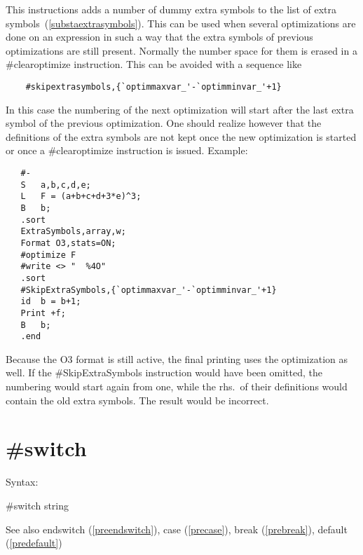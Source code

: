 \noindent This instructions adds a number of dummy extra 
symbols to the list of extra 
symbols~(\ref{substaextrasymbols}). This can be used when several 
optimizations are done on an expression in such a way that the extra 
symbols of previous optimizations are still present. Normally the number 
space for them is erased in a \#clearoptimize instruction. This can be 
avoided with a sequence like
\begin{verbatim}
	#skipextrasymbols,{`optimmaxvar_'-`optimminvar_'+1}
\end{verbatim}
In this case the numbering of the next optimization will start after the 
last extra symbol of the previous optimization.
One should realize however that the definitions of the extra symbols are 
not kept once the new optimization is started or once a \#clearoptimize 
instruction is issued. Example:
\begin{verbatim}
   #-
   S   a,b,c,d,e;
   L   F = (a+b+c+d+3*e)^3;
   B   b;
   .sort
   ExtraSymbols,array,w;
   Format O3,stats=ON;
   #optimize F
   #write <> "  %4O"
   .sort
   #SkipExtraSymbols,{`optimmaxvar_'-`optimminvar_'+1}
   id  b = b+1;
   Print +f;
   B   b;
   .end
\end{verbatim}
Because the O3 format is still active, the final printing uses the 
optimization as well. If the \#SkipExtraSymbols instruction would have been 
omitted, the numbering would start again from one, while the rhs.\ of their 
definitions would contain the old extra symbols. The result would be 
incorrect.


\section{\#switch}
\label{preswitch}

\noindent Syntax:

\#switch string
 
\noindent See also endswitch (\ref{preendswitch}),
        case (\ref{precase}),
        break (\ref{prebreak}),
        default (\ref{predefault})

